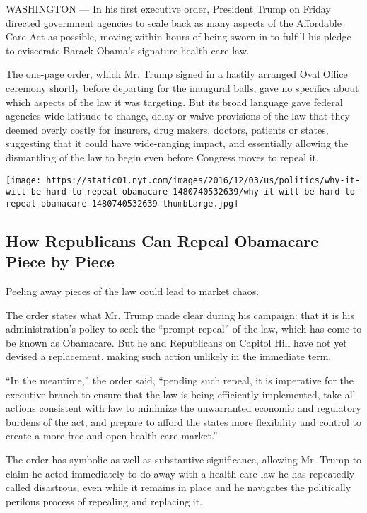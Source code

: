 WASHINGTON --- In his first executive order, President Trump on Friday
directed government agencies to scale back as many aspects of the
Affordable Care Act as possible, moving within hours of being sworn in
to fulfill his pledge to eviscerate Barack Obama's signature health care
law.

The one-page order, which Mr. Trump signed in a hastily arranged Oval
Office ceremony shortly before departing for the inaugural balls, gave
no specifics about which aspects of the law it was targeting. But its
broad language gave federal agencies wide latitude to change, delay or
waive provisions of the law that they deemed overly costly for insurers,
drug makers, doctors, patients or states, suggesting that it could have
wide-ranging impact, and essentially allowing the dismantling of the law
to begin even before Congress moves to repeal it.

\href{https://www.nytimes.com/interactive/2016/12/03/us/politics/why-it-will-be-hard-to-repeal-obamacare.html}{}

\texttt{[image: https://static01.nyt.com/images/2016/12/03/us/politics/why-it-will-be-hard-to-repeal-obamacare-1480740532639/why-it-will-be-hard-to-repeal-obamacare-1480740532639-thumbLarge.jpg]}

\hypertarget{how-republicans-can-repeal-obamacare-piece-by-piece}{%
\subsection{How Republicans Can Repeal Obamacare Piece by
Piece}\label{how-republicans-can-repeal-obamacare-piece-by-piece}}

Peeling away pieces of the law could lead to market chaos.

The order states what Mr. Trump made clear during his campaign: that it
is his administration's policy to seek the ``prompt repeal'' of the law,
which has come to be known as Obamacare. But he and Republicans on
Capitol Hill have not yet devised a replacement, making such action
unlikely in the immediate term.

``In the meantime,'' the order said, ``pending such repeal, it is
imperative for the executive branch to ensure that the law is being
efficiently implemented, take all actions consistent with law to
minimize the unwarranted economic and regulatory burdens of the act, and
prepare to afford the states more flexibility and control to create a
more free and open health care market.''

The order has symbolic as well as substantive significance, allowing Mr.
Trump to claim he acted immediately to do away with a health care law he
has repeatedly called disastrous, even while it remains in place and he
navigates the politically perilous process of repealing and replacing
it.

